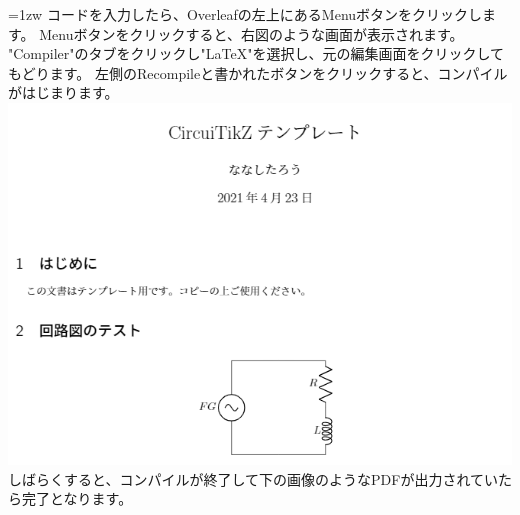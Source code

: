 		\noindent
		\begin{minipage}{0.65\hsize}\parindent=1zw
			コードを入力したら、Overleafの左上にあるMenuボタンをクリックします。
			Menuボタンをクリックすると、右図のような画面が表示されます。
			"Compiler"のタブをクリックし"LaTeX"を選択し、元の編集画面をクリックしてもどります。
			左側のRecompileと書かれたボタンをクリックすると、コンパイルがはじまります。
			\includegraphics[width=\textwidth]{overleaf-example-pdf.png}
			しばらくすると、コンパイルが終了して下の画像のようなPDFが出力されていたら完了となります。
		\end{minipage}\hfill
